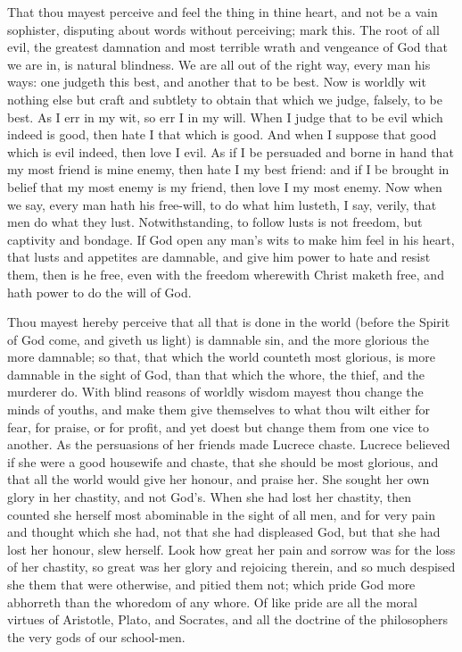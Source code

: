 That thou mayest perceive and feel the thing in thine 
heart, and not be a vain sophister, disputing about words 
without perceiving; mark this. The root of all evil, the 
greatest damnation and most terrible wrath and vengeance 
of God that we are in, is natural blindness. We are all 
out of the right way, every man his ways: one judgeth 
this best, and another that to be best. Now is worldly
wit nothing else but craft and subtlety to obtain that which 
we judge, falsely, to be best. As I err in my wit, so err I
in my will. When I judge that to be evil which indeed
is good, then hate I that which is good. And when I 
suppose that good which is evil indeed, then love I evil. 
As if I be persuaded and borne in hand that my most 
friend is mine enemy, then hate I my best friend: and if 
I be brought in belief that my most enemy is my friend, 
then love I my most enemy. Now when we say, every 
man hath his free-will, to do what him lusteth, I say, 
verily, that men do what they lust. Notwithstanding, to 
follow lusts is not freedom, but captivity and bondage. 
If God open any man's wits to make him feel in his heart, 
that lusts and appetites are damnable, and give him power 
to hate and resist them, then is he free, even with the 
freedom wherewith Christ maketh free, and hath power 
to do the will of God. 

Thou mayest hereby perceive that all that is done in the
world (before the Spirit of God come, and giveth us light) 
is damnable sin, and the more glorious the more damnable;
so that, that which the world counteth most glorious, is 
more damnable in the sight of God, than that which the 
whore, the thief, and the murderer do. With blind reasons 
of worldly wisdom mayest thou change the minds of youths,
and make them give themselves to what thou wilt either for 
fear, for praise, or for profit, and yet doest but change 
them from one vice to another. As the persuasions of 
her friends made Lucrece chaste. Lucrece believed if 
she were a good housewife and chaste, that she should be 
most glorious, and that all the world would give her 
honour, and praise her. She sought her own glory in her 
chastity, and not God's. When she had lost her chastity, 
then counted she herself most abominable in the sight of 
all men, and for very pain and thought which she had, 
not that she had displeased God, but that she had lost her 
honour, slew herself. Look how great her pain and sorrow
was for the loss of her chastity, so great was her glory 
and rejoicing therein, and so much despised she them that 
were otherwise, and pitied them not; which pride God 
more abhorreth than the whoredom of any whore. Of 
like pride are all the moral virtues of Aristotle, Plato, 
and Socrates, and all the doctrine of the philosophers the 
very gods of our school-men. 

